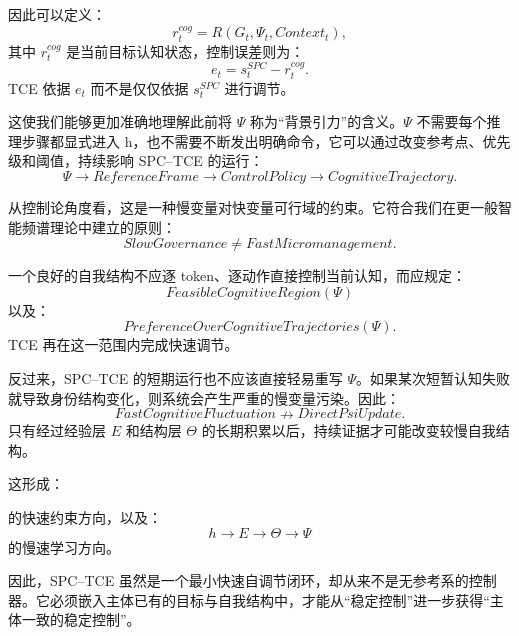 因此可以定义：
\begin{equation}
r_t^{cog}
=
R
\left(
G_t,\Psi_t,Context_t
\right),
\end{equation}
其中 $r_t^{cog}$ 是当前目标认知状态，控制误差则为：
\begin{equation}
e_t
=
s_t^{SPC}
-
r_t^{cog}.
\end{equation}
TCE 依据 $e_t$ 而不是仅仅依据 $s_t^{SPC}$ 进行调节。

这使我们能够更加准确地理解此前将 $\Psi$ 称为``背景引力''的含义。$\Psi$ 不需要每个推理步骤都显式进入 h，也不需要不断发出明确命令，它可以通过改变参考点、优先级和阈值，持续影响 SPC--TCE 的运行：
\begin{equation}
\Psi
\rightarrow
ReferenceFrame
\rightarrow
ControlPolicy
\rightarrow
CognitiveTrajectory.
\end{equation}

从控制论角度看，这是一种慢变量对快变量可行域的约束。它符合我们在更一般智能频谱理论中建立的原则：
\begin{equation}
\boxed{
SlowGovernance
\neq
FastMicromanagement.
}
\end{equation}

一个良好的自我结构不应逐 token、逐动作直接控制当前认知，而应规定：
\begin{equation}
FeasibleCognitiveRegion(\Psi)
\end{equation}
以及：
\begin{equation}
PreferenceOverCognitiveTrajectories(\Psi).
\end{equation}
TCE 再在这一范围内完成快速调节。

反过来，SPC--TCE 的短期运行也不应该直接轻易重写 $\Psi$。如果某次短暂认知失败就导致身份结构变化，则系统会产生严重的慢变量污染。因此：
\begin{equation}
FastCognitiveFluctuation
\nrightarrow
DirectPsiUpdate.
\end{equation}
只有经过经验层 $E$ 和结构层 $\Theta$ 的长期积累以后，持续证据才可能改变较慢自我结构。

这形成：
\begin{statementbox}
\centering
{}
\end{statementbox}
的快速约束方向，以及：
\begin{equation}
\boxed{
h
\rightarrow
E
\rightarrow
\Theta
\rightarrow
\Psi
}
\end{equation}
的慢速学习方向。

因此，SPC--TCE 虽然是一个最小快速自调节闭环，却从来不是无参考系的控制器。它必须嵌入主体已有的目标与自我结构中，才能从``稳定控制''进一步获得``主体一致的稳定控制''。

